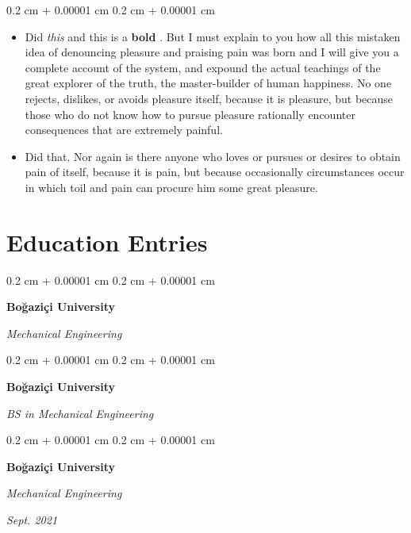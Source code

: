 \documentclass[10pt, letterpaper]{article}
\newenvironment{highlights}{
    \begin{itemize}[
        topsep=0.10 cm,
        parsep=0.10 cm,
        partopsep=0pt,
        itemsep=0pt,
        leftmargin=0.4 cm + 10pt
    ]
}{
    \end{itemize}
} %
\newenvironment{onecolentry}{
    \begin{adjustwidth}{
        0.2 cm + 0.00001 cm
    }{
        0.2 cm + 0.00001 cm
    }
}{
    \end{adjustwidth}
} %
\newenvironment{twocolentry}[2][]{
    \onecolentry
    \def\secondColumn{#2}
    \setcolumnwidth{\fill, 4.5 cm}
    \begin{paracol}{2}
}{
    \switchcolumn \raggedleft \secondColumn
    \end{paracol}
    \endonecolentry
} %
\let\hrefWithoutArrow\href
\renewcommand{\href}[2]{\hrefWithoutArrow{#1}{\mbox{\ifthenelse{\equal{#2}{}}{ }{#2 }\raisebox{.15ex}{\footnotesize \faExternalLink*}}}}
\begin{document}
        \vspace{0.10 cm-3px}
        \begin{onecolentry}
            \begin{highlights}
                \item Did \textit{this} and this is a \textbf{bold} \href{https://example.com}{link}. But I must explain to you how all this mistaken idea of denouncing pleasure and praising pain was born and I will give you a complete account of the system, and expound the actual teachings of the great explorer of the truth, the master-builder of human happiness. No one rejects, dislikes, or avoids pleasure itself, because it is pleasure, but because those who do not know how to pursue pleasure rationally encounter consequences that are extremely painful.
                \item Did that. Nor again is there anyone who loves or pursues or desires to obtain pain of itself, because it is pain, but because occasionally circumstances occur in which toil and pain can procure him some great pleasure.
            \end{highlights}
        \end{onecolentry}



    
    \section{Education Entries}

        
        \begin{onecolentry}
            \textbf{Boğaziçi University}

            \textit{Mechanical Engineering}
        \end{onecolentry}



        \vspace{0.2 cm-3px}

        \begin{onecolentry}
            \textbf{Boğaziçi University}

            \textit{BS in Mechanical Engineering}
        \end{onecolentry}



        \vspace{0.2 cm-3px}

        \begin{twocolentry}{
            
            
        \textit{Sept. 2021}}
            \textbf{Boğaziçi University}

            \textit{Mechanical Engineering}
        \end{twocolentry}
\end{document}
